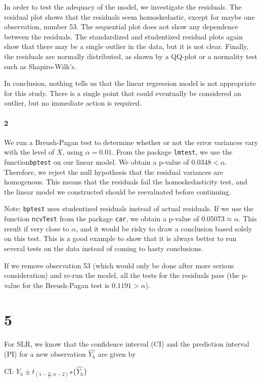 \documentclass[]{article}
\let\oldparagraph\paragraph
\renewcommand{\paragraph}[1]{\oldparagraph{#1}\mbox{}}
\begin{document}
In order to test the adequacy of the model, we investigate the residuals. The residual plot shows that the residuals seem homoskedastic, except for maybe one observation, number 53. The sequential plot does not show any dependence between the residuals. The standardized and studentized residual plots again show that there may be a single outlier in the data, but it is not clear. Finally, the residuals are normally distributed, as shown by a QQ-plot or a normality test such as Shapiro-Wilk's.

In conclusion, nothing tells us that the linear regression model is not appropriate for this study. There is a single point that could eventually be considered an outlier, but no immediate action is required.

\paragraph{2}
We run a Breush-Pagan test to determine whether or not the error variances vary with the level of $X$, using $\alpha = 0.01$. From the package \texttt{lmtest}, we use the function\texttt{bptest} on our linear model. We obtain a p-value of $0.0348 < \alpha$. Therefore, we reject the null hypothesis that the residual variances are homogenous. This means that the residuals fail the homoskedasticity test, and the linear model we constructed should be reevaluated before continuing.

Note: \texttt{bptest} uses studentized residuals instead of actual residuals. If we use the function \texttt{ncvTest} from the package \texttt{car}, we obtain a p-value of $0.05073 \approx \alpha$. This result if very close to $\alpha$, and it would be risky to draw a conclusion based solely on this test. This is a good example to show that it is always better to run several tests on the data instead of coming to hasty conclusions.

If we remove observation 53 (which would only be done after more serious consideration) and re-run the model, all the tests for the residuals pass (the p-value for the Breush-Pagan test is $0.1191 > \alpha$).

\section*{5}
For SLR, we know that the confidence interval (CI) and the prediction interval (PI) for a new observation $\hat{Y_h}$ are given by

CI: $\hat{Y_h} \pm t_{(1-\frac{\alpha}{2}; n-2)}s\{\hat{Y_h}\}$
\end{document}
